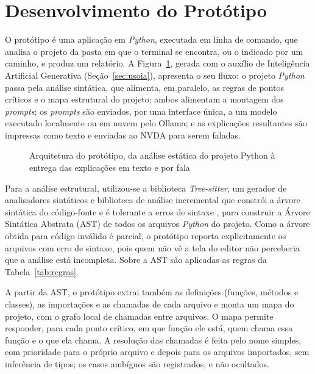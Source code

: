 \documentclass[
    12pt,                   %
    openright,              %
    oneside,                %
    a4paper,                %
    sumario=tradicional,    %
    english,                %
    brazil,                 %
    ]{abntex2}
\begin{document}
\section{Desenvolvimento do Protótipo}\label{sec:prototipo}

O protótipo é uma aplicação em \textit{Python}, executada em linha de comando, que analisa o projeto da pasta em que o terminal se encontra, ou o indicado por um caminho, e produz um relatório. A Figura~\ref{fig:arquitetura}, gerada com o auxílio de Inteligência Artificial Generativa (Seção~\ref{sec:usoia}), apresenta o seu fluxo: o projeto \textit{Python} passa pela análise sintática, que alimenta, em paralelo, as regras de pontos críticos e o mapa estrutural do projeto; ambos alimentam a montagem dos \textit{prompts}; os \textit{prompts} são enviados, por uma interface única, a um modelo executado localmente ou em nuvem pelo Ollama; e as explicações resultantes são impressas como texto e enviadas ao NVDA para serem faladas.

\begin{figure}[htbp]
  \centering
  
  \caption{Arquitetura do protótipo, da análise estática do projeto Python à entrega das explicações em texto e por fala}
  \label{fig:arquitetura}
\end{figure}

Para a análise estrutural, utilizou-se a biblioteca \textit{Tree-sitter}, um gerador de analisadores sintáticos e biblioteca de análise incremental que constrói a árvore sintática do código-fonte e é tolerante a erros de sintaxe \cite{treesitter}, para construir a Árvore Sintática Abstrata (AST) de todos os arquivos \textit{Python} do projeto. Como a árvore obtida para código inválido é parcial, o protótipo reporta explicitamente os arquivos com erro de sintaxe, pois quem não vê a tela do editor não perceberia que a análise está incompleta. Sobre a AST são aplicadas as regras da Tabela~\ref{tab:regras}.

A partir da AST, o protótipo extrai também as definições (funções, métodos e classes), as importações e as chamadas de cada arquivo e monta um mapa do projeto, com o grafo local de chamadas entre arquivos. O mapa permite responder, para cada ponto crítico, em que função ele está, quem chama essa função e o que ela chama. A resolução das chamadas é feita pelo nome simples, com prioridade para o próprio arquivo e depois para os arquivos importados, sem inferência de tipos; os casos ambíguos são registrados, e não ocultados.
\end{document}
